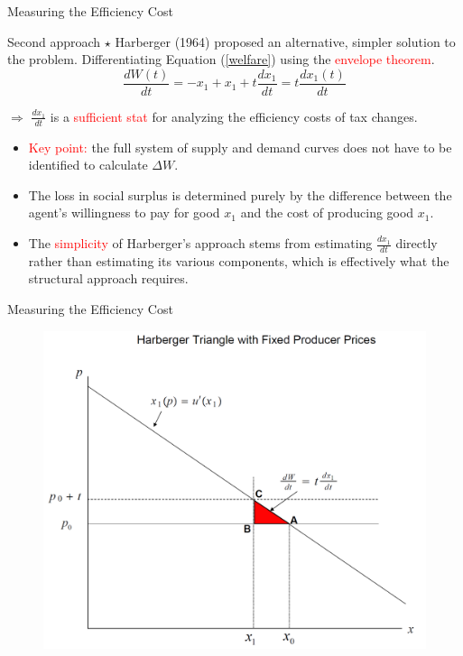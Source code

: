 \documentclass{beamer}
\begin{document}
\begin{frame}{Measuring the Efficiency Cost}
	\begin{block}{Second approach $\star$}
		Harberger (1964) proposed an alternative, simpler solution to the problem. Differentiating Equation (\ref{welfare}) using the \textcolor{red}{envelope theorem}.
		\begin{equation}\label{welfare change}
			\frac{dW(t)}{dt} = -x_1 + x_1 + t\frac{dx_1}{dt} = t\frac{dx_1(t)}{dt}
		\end{equation}

		$\Rightarrow$ $\frac{dx_1}{dt}$ is a \textcolor{red}{sufficient stat} for analyzing the efficiency costs of tax changes.
		\begin{itemize}
			\item \textcolor{red}{Key point:} the full system of supply and demand curves does not have to be identified to calculate $\Delta W$.
			\item The loss in social surplus is determined purely by the difference between the agent’s willingness to pay for good $x_1$ and the cost of producing good $x_1$.
			\item The \textcolor{red}{simplicity} of Harberger’s approach stems from estimating $\frac{dx_1}{dt}$ directly rather than estimating its various components, which is effectively what the structural approach requires.
		\end{itemize}
	\end{block}
\end{frame}
\begin{frame}{Measuring the Efficiency Cost}
	\begin{figure}[h]
		\centering
		\includegraphics[scale=0.44]{harberger_tri.png}
	\end{figure}	
\end{frame}
\end{document}
